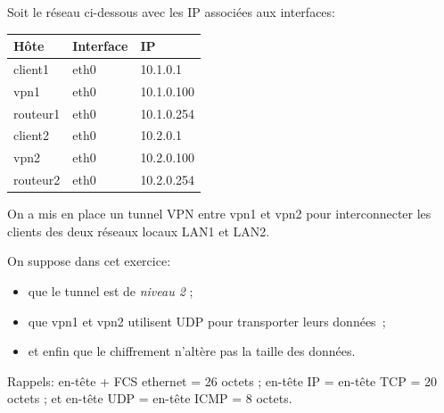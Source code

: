 
Soit le réseau ci-dessous avec les IP associées aux interfaces:

\begin{center}
  \begin{minipage}{0.69\textwidth}\end{minipage}
  \begin{minipage}{0.3\textwidth}
    \begin{tabular}{|l|l|l|}
      \hline
      Hôte & Interface & IP
      \\
      \hline
      client1 & eth0 & 10.1.0.1\\
      vpn1 & eth0 & 10.1.0.100\\
      routeur1 & eth0 & 10.1.0.254\\
      \hline
      client2 & eth0 & 10.2.0.1\\
      vpn2 & eth0 & 10.2.0.100\\
      routeur2 & eth0 & 10.2.0.254\\
      \hline
    \end{tabular}
  \end{minipage}
\end{center}

On a mis en place un tunnel VPN entre vpn1 et vpn2 pour interconnecter
les clients des deux réseaux locaux LAN1 et LAN2.

On suppose dans cet exercice:
\begin{itemize}
\item que le tunnel est de {\em niveau 2} ;
\item que vpn1 et vpn2 utilisent UDP pour transporter leurs données~;
\item et enfin que le chiffrement n'altère pas la taille des données.
\end{itemize}

Rappels: en-tête + FCS ethernet = 26 octets ; en-tête IP = en-tête TCP
= 20 octets ; et en-tête UDP = en-tête ICMP = 8 octets.
